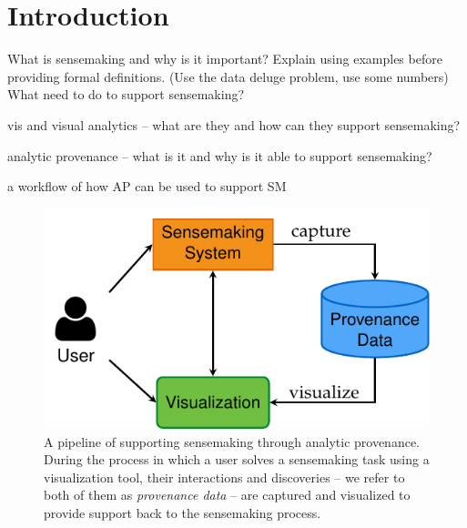 \chapter{Introduction}

\graphicspath{{Chapter1/figures/}}

What is sensemaking and why is it important? Explain using examples before providing formal definitions. (Use the data deluge problem, use some numbers) What need to do to support sensemaking?

vis and visual analytics -- what are they and how can they support sensemaking?

analytic provenance -- what is it and why is it able to support sensemaking?

a workflow of how AP can be used to support SM

\begin{figure}[!htb]
	\centering
	\includegraphics{workflow}
	\caption{A pipeline of supporting sensemaking through analytic provenance. During the process in which a user solves a sensemaking task using a visualization tool, their interactions and discoveries -- we refer to both of them as \emph{provenance data} -- are captured and visualized to provide support back to the sensemaking process.}
	\label{fig:workflow}
\end{figure}

